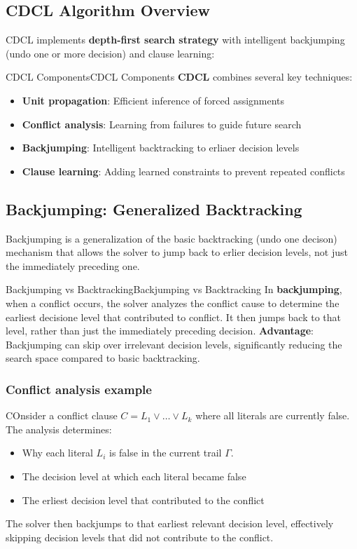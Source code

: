 \documentclass[a4paper]{article}
\theoremstyle{definition}
\begin{document}
\subsection{CDCL Algorithm Overview}
CDCL implements \textbf{depth-first search strategy} with intelligent backjumping (undo one or  more decision) 
and clause learning:
\begin{definition}{CDCL Components}{CDCL Components}
\textbf{CDCL} combines several key techniques:
\begin{itemize}
    \item \textbf{Unit propagation}: Efficient inference of forced assignments
    \item \textbf{Conflict analysis}: Learning from failures to guide future search 
    \item \textbf{Backjumping}: Intelligent backtracking to erliaer decision levels
    \item \textbf{Clause learning}: Adding learned constraints to prevent repeated conflicts
\end{itemize}
\end{definition}
\subsection{Backjumping: Generalized Backtracking}
Backjumping is a generalization of the basic backtracking (undo one decison) mechanism that allows 
the solver to jump back to erlier decision levels, not just the immediately preceding one.
\begin{definition}{Backjumping vs Backtracking}{Backjumping vs Backtracking}
In \textbf{backjumping}, when a conflict occurs, the solver 
analyzes the conflict cause to determine the earliest decisione level that contributed to conflict.
It then jumps back to that level, rather than just the immediately preceding decision.
\vspace{1em}
\noindent
\newline
\textbf{Advantage}: Backjumping can skip over irrelevant decision levels, significantly reducing 
the search space compared to basic backtracking.
\end{definition}
\subsubsection{Conflict analysis example}
COnsider a conflict clause \( C = L_1 \vee \ldots \vee L_k \) where all literals are currently false. The analysis 
determines:
\begin{itemize}
    \item Why each literal \( L_i \) is false in the current trail \( \varGamma \).
    \item The decision level at which each literal became false
    \item The erliest decision level that contributed to the conflict
\end{itemize}
The solver then backjumps to that earliest relevant decision level, effectively skipping decision 
levels that did not contribute to the conflict.
\end{document}
